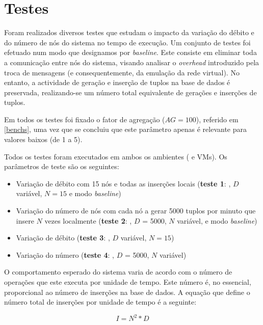 
\section{Testes}

Foram realizados diversos testes que estudam o impacto da variação do débito e do número de nós do sistema no tempo de
execução. Um conjunto de testes foi efetuado num modo que designamos por \textit{baseline}. 
Este consiste em eliminar toda a comunicação entre nós do sistema, visando analisar o \textit{overhead}
introduzido pela troca de mensagens (e consequentemente, da emulação da rede virtual). No entanto, a
actividade de geração e inserção de tuplos na base de dados é preservada, realizando-se um
número total equivalente de gerações e inserções de tuplos.


Em todos os testes foi fixado o fator de agregação ($AG = 100$), referido em \ref{benchs}, uma vez que se concluiu
que este parâmetro apenas é relevante para valores baixos (de 1 a 5).

Todos os testes foram executados em ambos os ambientes ({\conts} e VMs). Os parâmetros de teste são os seguintes:
\begin{itemize}

\item Variação de débito com 15 nós e todas as inserções locais (\textbf{teste 1}: {\conts}, $D$ variável, $N = 15$ e modo \textit{baseline})
\item Variação do número de nós com cada nó a gerar 5000 tuplos por minuto que insere $N$ vezes localmente (\textbf{teste 2}: {\conts}, $D$ = 5000, $N$ variável, e modo \textit{baseline})

\item Variação de débito (\textbf{teste 3}: {\conts}, $D$ variável, $N = 15$)
\item Variação do número (\textbf{teste 4}: {\conts}, $D$ = 5000, $N$ variável)

\end{itemize}

O comportamento esperado do sistema varia de acordo com o número de operações que este executa por unidade de tempo. Este número é,
no essencial, proporcional ao número de inserções na base de dados.
A equação que define o número total de inserções por unidade de tempo é a seguinte:

\begin{equation}
\label{eq:operacoes}
 I = N^2 * D
\end{equation}


